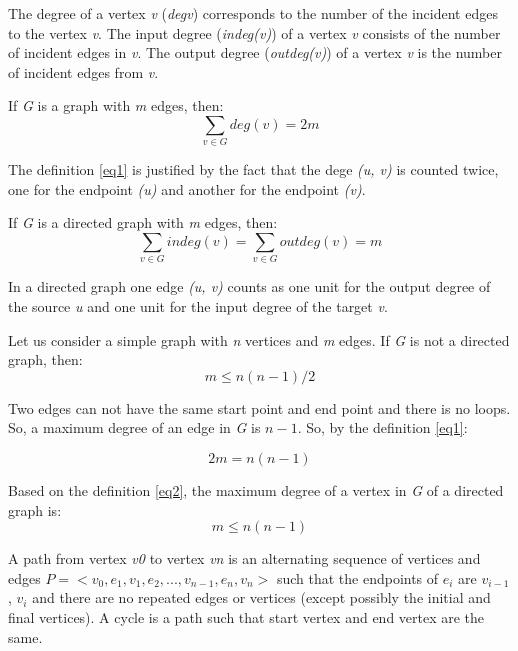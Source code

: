 \documentclass[a4paper]{article}
\begin{document}
    The degree of a vertex \emph{v} (\emph{deg{v}}) corresponds to
    the number of the incident edges to the vertex \emph{v}.
    The input degree (\emph{indeg(v)}) of a vertex \emph{v} consists
    of the number of incident edges in \emph{v}.
    The output degree (\emph{outdeg(v)}) of a vertex \emph{v} is the
    number of incident edges from \emph{v}.

    If \emph{G} is a graph with \emph{m} edges, then:
    \begin{equation} \label{eq1}
        \sum_{v \in G} deg(v) = 2m
    \end{equation}

    The definition \ref{eq1} is justified by the fact that the dege
    \emph{(u, v)} is counted twice, one for the endpoint \emph{(u)} and
    another for the endpoint \emph{(v)}.

    If \emph{G} is a directed graph with \emph{m} edges, then:
    \begin{equation} \label{eq2}
        \sum_{v \in G} indeg(v) = \sum_{v \in G} outdeg(v) = m
    \end{equation}

    In a directed graph one edge \emph{(u, v)} counts as one unit
    for the output degree of the source \emph{u} and one unit for
    the input degree of the target \emph{v}.

    Let us consider a simple graph with \emph{n} vertices and \emph{m}
    edges. If \emph{G} is not a directed graph, then:
    \begin{equation} \label{eq3}
        m \le n(n - 1) / 2
    \end{equation}

    Two edges can not have the same start point and end point and there
    is no loops. So, a maximum degree of an edge in \emph{G} is $n - 1$.
    So, by the definition \ref{eq1}:

    \begin{equation} \label{eq4}
        2m = n(n - 1)
    \end{equation}

    Based on the definition \ref{eq2}, the maximum degree of a vertex in \emph{G}
    of a directed graph is:
    \begin{equation}
        m \le n(n-1)
    \end{equation}



    A path from vertex \emph{v0} to vertex \emph{vn} is an alternating sequence of
    vertices and edges $ P =< v_0, e_1, v_1, e_2, ..., v_{n-1}, e_n, v_n > $
    such that the endpoints of $ e_i $ are $ v_{i-1} $, $ v_i $ and there are no
    repeated edges or vertices (except possibly the initial and final vertices).
    A cycle is a path such that start vertex and end vertex are the same.
\end{document}
